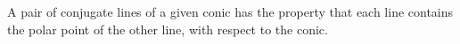 A pair of conjugate lines of a given conic has the property that 
each line contains the polar point of the other line, with respect
to the conic.